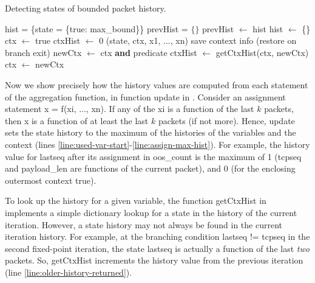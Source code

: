 \begin{algorithm}
  \caption{Detecting states of bounded packet history.}
  \label{alg:bounded-packet-history}
  \begin{algorithmic}[1]
    \State hist = \{state = \{true: max\_bound\}\}  \label{line:curr-hist-init}
    \State prevHist = $\{\}$  \label{line:prev-hist-init}
     \label{line:fixed-point}
    \State prevHist $\gets$ hist 
    \State hist $\gets$ \{\}
    \State ctx $\gets$ true 
    \State ctxHist $\gets$ 0
    \label{line:stmt-iteration}
    (state, ctx, x1, ..., xn)\label{line:stmt-history-update}
    \label{line:encounter-branching}
    \State save context info (restore on branch exit)\label{line:branch-ctx-update-start}
    \State newCtx $\gets$ ctx \textbf{and} predicate
    \State ctxHist $\gets$ {\sc getCtxHist}(ctx, newCtx)
    \State ctx $\gets$ newCtx\label{line:branch-ctx-update-end}
    \EndIf
    \EndFor
    \EndWhile
    \EndFunction
  \end{algorithmic}
\end{algorithm}

Now we show precisely how the history values are computed from each statement of
the aggregation function, in function {\sc update} in
. Consider an assignment statement {\ct x = f(xi, ...,
  xn)}. If any of the {\ct xi} is a function of the last $k$ packets, then {\ct
  x} is a function of at least the last $k$ packets (if not more). Hence, {\sc
  update} sets the state history to the maximum of the histories of the
variables and the context (lines
\ref{line:used-var-start}-\ref{line:assign-max-hist}). For example, the history
value for {\ct lastseq} after its assignment in {\ct oos\_count} is the maximum
of 1 ({\ct tcpseq} and {\ct payload\_len} are functions of the current packet),
and 0 (for the enclosing outermost context {\ct true}).

To look up the history for a given variable, the function {\sc getCtxHist} in
 implements a simple dictionary lookup for a state in the
history of the current iteration. However, a state history may not always be
found in the current iteration history. For example, at the branching condition
{\ct lastseq != tcpseq} in the second fixed-point iteration, the state {\ct
  lastseq} is actually a function of the last {\em two} packets. So, {\sc
  getCtxHist} increments the history value from the previous iteration (line
\ref{line:older-history-returned}).

